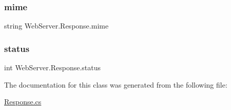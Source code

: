 \subsubsection{\texorpdfstring{mime}{mime}}
{\footnotesize\ttfamily string Web\+Server.\+Response.\+mime\hspace{0.3cm}{\ttfamily [private]}}

\mbox{\label{class_web_server_1_1_response_a132606b61e9c9d01b80114418920c0f7}} 
\subsubsection{\texorpdfstring{status}{status}}
{\footnotesize\ttfamily int Web\+Server.\+Response.\+status\hspace{0.3cm}{\ttfamily [private]}}



The documentation for this class was generated from the following file\+:\begin{DoxyCompactItemize}
\item 
\hyperlink{_response_8cs}{Response.\+cs}\end{DoxyCompactItemize}
